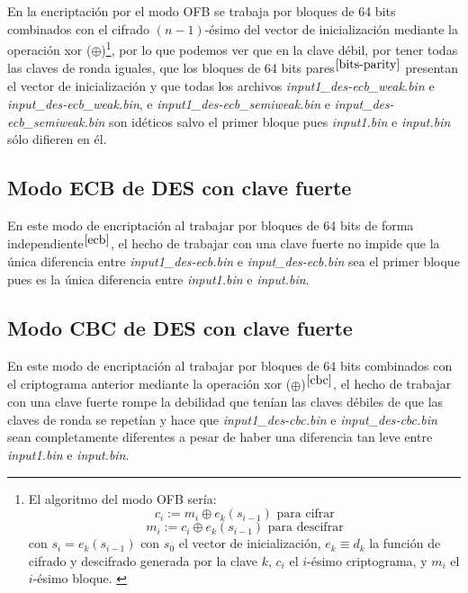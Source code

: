 \documentclass[a4paper, 11pt]{article}
\begin{document}
		En la encriptación por el modo OFB se trabaja por bloques de 64 bits combinados con el cifrado $(n-1)$-ésimo del vector
		de inicialización mediante la operación xor ($\oplus$)\footnote{El algoritmo del modo OFB sería: \[c_i := m_i \oplus
		e_k(s_{i-1}) \text{ para cifrar}\] \[m_i := c_i \oplus e_k(s_{i-1}) \text{ para descifrar}\] con $s_i = e_k(s_{i-1})$
		con $s_0$ el vector de inicialización, $e_k \equiv d_k$ la función de cifrado y descifrado generada por la clave $k$,
		$c_i$ el $i$-ésimo criptograma, y $m_i$ el $i$-ésimo bloque. \label{ofb}}, por lo que podemos ver que en la clave débil,
		por tener todas las claves de ronda iguales, que los bloques de 64 bits pares$^{\ref{bits-parity}}$ presentan el vector
		de inicialización y que todas los archivos \textit{input1\_des-ecb\_weak.bin} e \textit{input\_des-ecb\_weak.bin}, e
		\textit{input1\_des-ecb\_semiweak.bin} e \textit{input\_des-ecb\_semiweak.bin} son idéticos salvo el primer bloque
		pues \textit{input1.bin} e \textit{input.bin} sólo difieren en él.
				
	\subsection{Modo ECB de DES con clave fuerte}
		En este modo de encriptación al trabajar por bloques de 64 bits de forma independiente$^{\ref{ecb}}$, el hecho de trabajar
		con una clave fuerte no impide que la única diferencia entre \textit{input1\_des-ecb.bin} e \textit{input\_des-ecb.bin}
		sea el primer bloque pues es la única diferencia entre \textit{input1.bin} e \textit{input.bin}.
		
	\subsection{Modo CBC de DES con clave fuerte}
		En este modo de encriptación al trabajar por bloques de 64 bits combinados con el criptograma anterior mediante
		la operación xor ($\oplus$)$^{\ref{cbc}}$, el hecho de trabajar con una clave fuerte rompe la debilidad que tenían las
		claves débiles de que las claves de ronda se repetían y hace que \textit{input1\_des-cbc.bin} e \textit{input\_des-cbc.bin}
		sean completamente diferentes a pesar de haber una diferencia tan leve entre \textit{input1.bin} e \textit{input.bin}.
		
\end{document}
